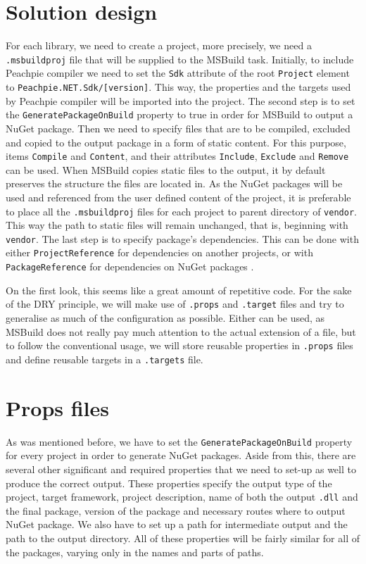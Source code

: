 \section{Solution design}
For each library, we need to create a project, more precisely, we need a \texttt{.msbuildproj} file that will be supplied to the MSBuild task. Initially, to include Peachpie compiler we need to set the \texttt{Sdk} attribute of the root \texttt{Project} element to \texttt{Peachpie.NET.Sdk/[version]}. This way, the properties and the targets used by Peachpie compiler will be imported into the project. The second step is to set the \texttt{GeneratePackageOnBuild} property to true in order for MSBuild to output a NuGet package. Then we need to specify files that are to be compiled, excluded and copied to the output package in a form of static content. For this purpose, items \texttt{Compile} and \texttt{Content}, and their attributes \texttt{Include}, \texttt{Exclude} and \texttt{Remove} can be used. When MSBuild copies static files to the output, it by default preserves the structure the files are located in. As the NuGet packages will be used and referenced from the user defined content of the project, it is preferable to place all the \texttt{.msbuildproj} files for each project to parent directory of \texttt{vendor}. This way the path to static files will remain unchanged, that is, beginning with \texttt{vendor}. The last step is to specify package's dependencies. This can be done with either \texttt{ProjectReference} for dependencies on another projects, or with \texttt{PackageReference} for dependencies on NuGet packages \citep{microsoft.docs}.

On the first look, this seems like a great amount of repetitive code. For the sake of the DRY principle, we will make use of \texttt{.props} and \texttt{.target} files and try to generalise as much of the configuration as possible. Either can be used, as MSBuild does not really pay much attention to the actual extension of a file, but to follow the conventional usage, we will store reusable properties in \texttt{.props} files and define reusable targets in a \texttt{.targets} file.


\section{Props files} As was mentioned before, we have to set the \texttt{GeneratePackageOnBuild} property for every project in order to generate NuGet packages. Aside from this, there are several other significant and required properties that we need to set-up as well to produce the correct output. These properties specify the output type of the project, target framework, project description, name of both the output \texttt{.dll} and the final package, version of the package and necessary routes where to output NuGet package. We also have to set up a path for intermediate output and the path to the output directory. All of these properties will be fairly similar for all of the packages, varying only in the names and parts of paths.

